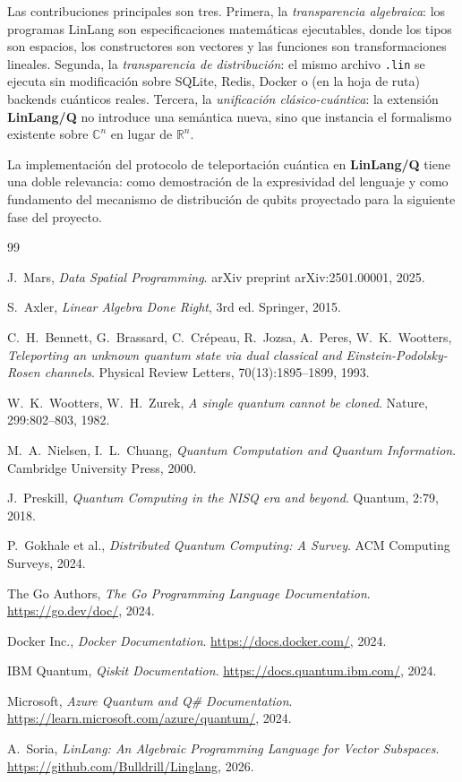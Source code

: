 \documentclass[12pt, a4paper, openany]{report}
\theoremstyle{definition}
\newcommand{\linlangQ}{\textbf{LinLang/Q}}
\begin{document}
Las contribuciones principales son tres. Primera, la \emph{transparencia algebraica}: los programas LinLang son especificaciones matemáticas ejecutables, donde los tipos son espacios, los constructores son vectores y las funciones son transformaciones lineales. Segunda, la \emph{transparencia de distribución}: el mismo archivo \texttt{.lin} se ejecuta sin modificación sobre SQLite, Redis, Docker o (en la hoja de ruta) backends cuánticos reales. Tercera, la \emph{unificación clásico-cuántica}: la extensión \linlangQ{} no introduce una semántica nueva, sino que instancia el formalismo existente sobre $\mathbb{C}^n$ en lugar de $\mathbb{R}^n$.

La implementación del protocolo de teleportación cuántica en \linlangQ{} tiene una doble relevancia: como demostración de la expresividad del lenguaje y como fundamento del mecanismo de distribución de qubits proyectado para la siguiente fase del proyecto.

\begin{thebibliography}{99}

J.~Mars, \emph{Data Spatial Programming}.
arXiv preprint arXiv:2501.00001, 2025.

S.~Axler, \emph{Linear Algebra Done Right}, 3rd ed.
Springer, 2015.

C.~H.~Bennett, G.~Brassard, C.~Crépeau, R.~Jozsa, A.~Peres, W.~K.~Wootters,
\emph{Teleporting an unknown quantum state via dual classical and
Einstein-Podolsky-Rosen channels}.
Physical Review Letters, 70(13):1895--1899, 1993.

W.~K.~Wootters, W.~H.~Zurek,
\emph{A single quantum cannot be cloned}.
Nature, 299:802--803, 1982.

M.~A.~Nielsen, I.~L.~Chuang,
\emph{Quantum Computation and Quantum Information}.
Cambridge University Press, 2000.

J.~Preskill,
\emph{Quantum Computing in the NISQ era and beyond}.
Quantum, 2:79, 2018.

P.~Gokhale et al.,
\emph{Distributed Quantum Computing: A Survey}.
ACM Computing Surveys, 2024.

The Go Authors,
\emph{The Go Programming Language Documentation}.
\url{https://go.dev/doc/}, 2024.

Docker Inc.,
\emph{Docker Documentation}.
\url{https://docs.docker.com/}, 2024.

IBM Quantum,
\emph{Qiskit Documentation}.
\url{https://docs.quantum.ibm.com/}, 2024.

Microsoft,
\emph{Azure Quantum and Q\# Documentation}.
\url{https://learn.microsoft.com/azure/quantum/}, 2024.

A.~Soria,
\emph{LinLang: An Algebraic Programming Language for Vector Subspaces}.
\url{https://github.com/Bulldrill/Linglang}, 2026.

\end{thebibliography}
\end{document}
